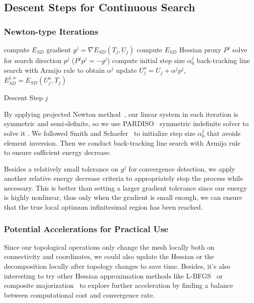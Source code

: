 
\subsection{Descent Steps for Continuous Search}
\label{sec:descentStep}


\subsubsection{Newton-type Iterations}

\begin{algorithm}[h]
\SetAlgoLined
{}

compute $E_{SD}$ gradient $g^{j} = \nabla E_{SD}(T_{j}, U_{j})$\;
compute $E_{SD}$ Hessian proxy $P^j$\;
solve for search direction $p^j$ ($P^j p^j = -g^j$)\;
compute initial step size $\alpha^j_0$\;
back-tracking line search with Armijo rule to obtain $\alpha^j$\;
update $U^a_{j} = U_j + \alpha^j p^j$, $E^{j,a}_{SD} = E_{SD}(U^a_{j}, T_{j})$\;

\caption{Descent Step $j$}
\end{algorithm}
By applying projected Newton method~\cite{Teran2005Robust}, our linear system in each iteration is symmetric and semi-definite, so we use PARDISO~\cite{pardiso-6.0a, pardiso-6.0b} symmetric indefinite solver to solve it . We followed Smith and Schaefer~ to initialize step size $\alpha^j_0$ that avoids element inversion. Then we conduct back-tracking line search with Armijo rule~\cite{Armijo1966Minimization} to ensure sufficient energy decrease.

Besides a relatively small tolerance on $g^j$ for convergence detection, we apply another relative energy decrease criteria to appropriately stop the process while necessary. This is better than setting a larger gradient tolerance since our energy is highly nonlinear, thus only when the gradient is small enough, we can ensure that the true local optimum infinitesimal region has been reached. 

\subsubsection{Potential Accelerations for Practical Use}

Since our topological operations only change the mesh locally both on connectivity and coordinates, we could also update the Hessian or the decomposition locally after topology changes to save time. Besides, it's also interesting to try other Hessian approximation methods like L-BFGS~\cite{Liu1989Limited} or composite majorization~\cite{Shtengel2017Geometric} to explore further acceleration by finding a balance between computational cost and convergence rate.

